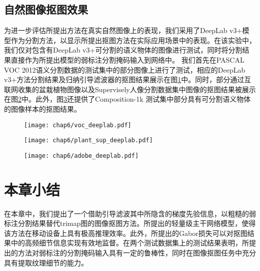 \subsection{自然图像抠图效果}
为进一步评估所提出方法在真实自然图像上的表现，我们采用了DeepLab v3+\cite{chen2018encoder}模型作为分割方法，以显示所提出抠图方法在实际应用场景中的表现。在该实验中，我们仅对包含有DeepLab v3+可分割的语义物体的图像进行测试，同时将分割结果直接作为所提出模型的弱标注分割掩码输入到网络中。
我们首先在PASCAL VOC 2012\cite{everingham2015pascal}语义分割数据的测试集中的部分图像上进行了测试，相应的DeepLab v3+方法分割结果及归纳引导滤波器的抠图结果展示在图\ref{fig6:voc_deeplab}中。同时，部分通过互联网收集的盆栽植物图像以及Supervisely人像分割数据集\cite{Supervise.ly}中图像的抠图结果被展示在图\ref{fig6:plant_sup_deeplab}中。此外，图\ref{fig6:adobe_deeplab}还提供了Composition-1k 测试集\cite{xu2017deep}中部分具有可分割语义物体的图像样本的抠图结果。
\begin{figure}[h]
	\centering
	\texttt{[image: chap6/voc\_deeplab.pdf]}
	\label{fig6:voc_deeplab}
\end{figure}
\begin{figure}[h]
	\centering
	\texttt{[image: chap6/plant\_sup\_deeplab.pdf]}
	\label{fig6:plant_sup_deeplab}
\end{figure}
\begin{figure}[h]
	\centering
	\texttt{[image: chap6/adobe\_deeplab.pdf]}
	\label{fig6:adobe_deeplab}
\end{figure}
\section{本章小结}
在本章中，我们提出了一个借助引导滤波其中所隐含的梯度先验信息，以粗糙的弱标注分割结果替代trimap图的图像抠图方法。所提出的轻量级主干网络模型，使得该方法在移动设备上具有极高推理效率。此外，所提出的Gabor损失可以对抠图结果中的高频细节信息实现有效地监督。在两个测试数据集上的测试结果表明，所提出的方法对弱标注的分割掩码输入具有一定的鲁棒性，同时在图像抠图任务中充分具有提取纹理细节的能力。